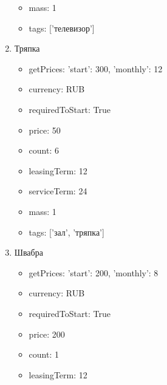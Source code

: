 \documentclass[a4paper,12pt]{article}
\begin{document}
\begin{enumerate}
\begin{itemize}
          \item mass: 1
        
          \item tags: ['телевизор']
        
        \end{itemize}
      
      \item Тряпка
        \begin{itemize}
        
          \item getPrices: {'start': 300, 'monthly': 12}
        
          \item currency: RUB
        
          \item requiredToStart: True
        
          \item price: 50
        
          \item count: 6
        
          \item leasingTerm: 12
        
          \item serviceTerm: 24
        
          \item mass: 1
        
          \item tags: ['зал', 'тряпка']
        
        \end{itemize}
      
      \item Швабра
        \begin{itemize}
        
          \item getPrices: {'start': 200, 'monthly': 8}
        
          \item currency: RUB
        
          \item requiredToStart: True
        
          \item price: 200
        
          \item count: 1
        
          \item leasingTerm: 12
        

\end{itemize}
\end{enumerate}
\end{document}
